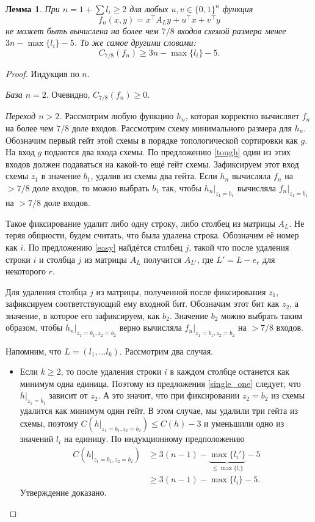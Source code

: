 \documentclass[oneside, a4paper]{article}
\newtheorem{lemma}{Лемма}
\theoremstyle{definition}
\theoremstyle{remark}
\begin{document}
\begin{lemma} \label{main}
При $n = 1 + \sum l_i \geq 2$ для любых $u, v \in \{0, 1\}^n$ функция
\[
f_n(x, y) = x^\top A_L y + u^\top x + v^\top y
\]
не может быть вычислена на более чем $7/8$ входов схемой размера менее $3n -
\max \{l_i\} - 5$. То же самое другими словами:
\[
C_{7/8}(f_n) \geq 3n - \max \{l_i\} - 5.
\]
\end{lemma}
\begin{proof}
Индукция по $n$.

\emph{База $n = 2$}. Очевидно, $C_{7/8}(f_n) \geq 0$.

\emph{Переход $n > 2$.} Рассмотрим любую функцию $h_n$, которая корректно
вычисляет $f_n$ на более чем $7/8$ доле входов. Рассмотрим схему минимального
размера для $h_n$. Обозначим первый гейт этой схемы в порядке топологической
сортировки как $g$. На вход $g$ подаются два входа схемы. По предложению \ref{tough}
один из этих входов должен подаваться на какой-то ещё гейт схемы. Зафиксируем
этот вход схемы $z_1$ в значение $b_1$, удалив из схемы два гейта. Если $h_n$
вычисляла $f_n$ на $> 7/8$ доле входов, то можно выбрать $b_1$ так, чтобы
$h_n \rvert_{z_1 = b_1}$ вычисляла $f_n \rvert_{z_1 = b_1}$ на $ > 7/8$ доле входов.

Такое фиксирование удалит либо одну строку, либо столбец из матрицы $A_L$. Не
теряя общности, будем считать, что была удалена строка. Обозначим её номер как
$i$. По предложению \ref{easy} найдётся столбец $j$, такой что после удаления
строки $i$ и столбца $j$ из матрицы $A_L$ получится $A_{L'}$, где $L' = L - e_r$
для некоторого $r$.

Для удаления столбца $j$ из матрицы, полученной после фиксирования $z_1$,
зафиксируем соответствующий ему входной бит. Обозначим этот бит как $z_2$, а
значение, в которое его зафиксируем, как $b_2$. Значение $b_2$ можно выбрать
таким образом, чтобы $h_n \rvert _ {z_1 = b_1, z_2 = b_2}$ верно вычисляла
$f_n \rvert _ {z_1 = b_1, z_2 = b_2}$ на $> 7/8$ входов.

Напомним, что $L = (l_1, \dots l_k)$. Рассмотрим два случая.
\begin{itemize}
\item Если $k \geq 2$, то после удаления строки $i$ в каждом столбце останется
как минимум одна единица. Поэтому из предложения \ref{single_one} следует, что
$h \rvert _ {z_1 = b_1}$ зависит от $z_2$. А это значит, что при фиксировании
$z_2 = b_2$ из схемы удалится как минимум один гейт. В этом случае, мы удалили
три гейта из схемы, поэтому $C(h \rvert _ {z_1 = b_1, z_2 = b_2}) \leq C(h) - 3$
и уменьшили одно из значений $l_i$ на единицу. По индукционному предположению
\[
\begin{aligned}
C(h \rvert _ {z_1 = b_1, z_2 = b_2}) &\geq 3(n - 1) - \underbrace{\max \{l_i'\}}_{\leq \max \{l_i\}} - 5 \\
&\geq 3(n - 1) - \max \{l_i\} - 5.
\end{aligned}
\]
Утверждение доказано.


\end{itemize}
\end{proof}
\end{document}

